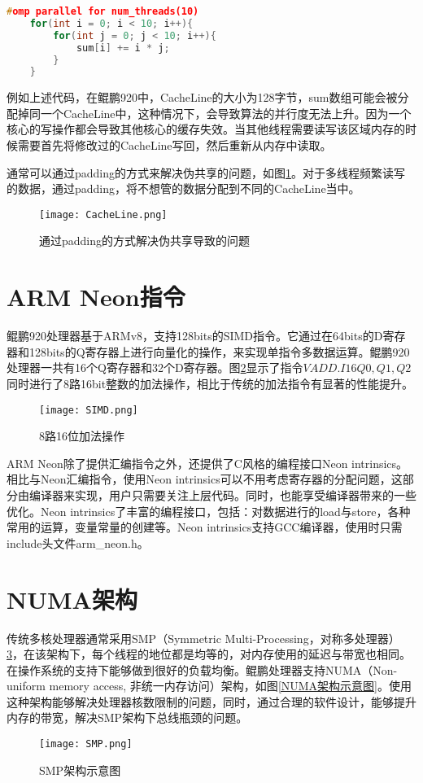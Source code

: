 \begin{lstlisting}[language=c++]
    #omp parallel for num_threads(10)
    for(int i = 0; i < 10; i++){
        for(int j = 0; j < 10; i++){
            sum[i] += i * j;
        }
    }
\end{lstlisting}

例如上述代码，在鲲鹏920中，CacheLine的大小为128字节，sum数组可能会被分配掉同一个CacheLine中，这种情况下，会导致算法的并行度无法上升。因为一个核心的写操作都会导致其他核心的缓存失效。当其他线程需要读写该区域内存的时候需要首先将修改过的CacheLine写回，然后重新从内存中读取。

通常可以通过padding的方式来解决伪共享的问题，如图\ref{通过padding的方式解决伪共享导致的问题}。对于多线程频繁读写的数据，通过padding，将不想管的数据分配到不同的CacheLine当中。

\begin{figure}[htbp]
    \centering
    \texttt{[image: CacheLine.png]}
    \caption{通过padding的方式解决伪共享导致的问题}
    \label{通过padding的方式解决伪共享导致的问题}
\end{figure}

\section{ARM Neon指令}

鲲鹏920处理器基于ARMv8，支持128bits的SIMD指令。它通过在64bits的D寄存器和128bits的Q寄存器上进行向量化的操作，来实现单指令多数据运算。鲲鹏920处理器一共有16个Q寄存器和32个D寄存器。图\ref{SIMD}显示了指令$VADD.I16 Q0, Q1, Q2$同时进行了8路16bit整数的加法操作，相比于传统的加法指令有显著的性能提升。
\begin{figure}[htbp]
    \centering
    \texttt{[image: SIMD.png]}
    \caption{8路16位加法操作}
    \label{SIMD}
\end{figure}
ARM Neon除了提供汇编指令之外，还提供了C风格的编程接口Neon intrinsics。相比与Neon汇编指令，使用Neon intrinsics可以不用考虑寄存器的分配问题，这部分由编译器来实现，用户只需要关注上层代码。同时，也能享受编译器带来的一些优化。Neon intrinsics了丰富的编程接口，包括：对数据进行的load与store，各种常用的运算，变量常量的创建等。Neon intrinsics支持GCC编译器，使用时只需include头文件arm\_neon.h。

\section{NUMA架构}

传统多核处理器通常采用SMP（Symmetric Multi-Processing，对称多处理器）\ref{SMP架构示意图}，在该架构下，每个线程的地位都是均等的，对内存使用的延迟与带宽也相同。在操作系统的支持下能够做到很好的负载均衡。鲲鹏处理器支持NUMA（Non-uniform memory access, 非统一内存访问）架构，如图\ref{NUMA架构示意图}。使用这种架构能够解决处理器核数限制的问题，同时，通过合理的软件设计，能够提升内存的带宽，解决SMP架构下总线瓶颈的问题。
\begin{figure}[htbp]
    \centering
    \texttt{[image: SMP.png]}
    \caption{SMP架构示意图}
    \label{SMP架构示意图}
\end{figure}


